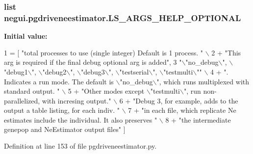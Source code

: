 \subsubsection[{\texorpdfstring{L\+S\+\_\+\+A\+R\+G\+S\+\_\+\+H\+E\+L\+P\+\_\+\+O\+P\+T\+I\+O\+N\+AL}{LS_ARGS_HELP_OPTIONAL}}]{\setlength{\rightskip}{0pt plus 5cm}list negui.\+pgdriveneestimator.\+L\+S\+\_\+\+A\+R\+G\+S\+\_\+\+H\+E\+L\+P\+\_\+\+O\+P\+T\+I\+O\+N\+AL}\hypertarget{namespacenegui_1_1pgdriveneestimator_aee59027c12769e0749f07a70867259b4}{}\label{namespacenegui_1_1pgdriveneestimator_aee59027c12769e0749f07a70867259b4}
{\bfseries Initial value\+:}
\begin{DoxyCode}
1 = [ \textcolor{stringliteral}{"total processes to use (single integer) Default is 1 process.  "} \(\backslash\)
2         + \textcolor{stringliteral}{"This arg is required if the final debug optional arg is added"},
3                 \textcolor{stringliteral}{"\(\backslash\)"no\_debug\(\backslash\)", \(\backslash\)"debug1\(\backslash\)", \(\backslash\)"debug2\(\backslash\)", \(\backslash\)"debug3\(\backslash\)", \(\backslash\)"testserial\(\backslash\)", \(\backslash\)"testmulti\(\backslash\)""} \(\backslash\)
4                 + \textcolor{stringliteral}{".  Indicates a run mode. The default is \(\backslash\)"no\_debug\(\backslash\)", which runs multiplexed with
       standard output.  "} \(\backslash\)
5                 + \textcolor{stringliteral}{"Other modes except \(\backslash\)"testmulti\(\backslash\)", run non-parallelized, with incresing output."} \(\backslash\)
6                 + \textcolor{stringliteral}{"Debug 3, for example, adds to the output a table listing, for each indiv. "} \(\backslash\)
7                 + \textcolor{stringliteral}{"in each file, which replicate Ne estimates include the individual.  It also preserves "} 
      \(\backslash\)
8                 + \textcolor{stringliteral}{"the intermediate genepop and NeEstimator output files"} ]
\end{DoxyCode}


Definition at line 153 of file pgdriveneestimator.\+py.

